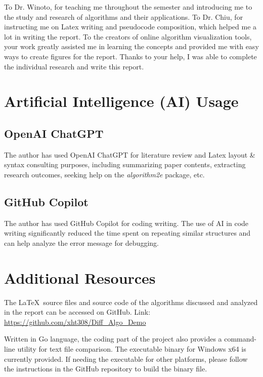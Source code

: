 \documentclass[sigplan,screen]{acmart}
\begin{document}

\begin{acks}
To Dr. Winoto, for teaching me throughout the semester and introducing me to the study and research of algorithms and their applications. To Dr. Chiu, for instructing me on Latex writing and pseudocode composition, which helped me a lot in writing the report. To the creators of online algorithm visualization tools, your work greatly assisted me in learning the concepts and provided me with easy ways to create figures for the report. Thanks to your help, I was able to complete the individual research and write this report.
\end{acks}




\appendix

\section{Artificial Intelligence (AI) Usage}

\subsection{OpenAI ChatGPT}

The author has used OpenAI ChatGPT for literature review and Latex layout \& syntax consulting purposes, including summarizing paper contents, extracting research outcomes, seeking help on the \textit{algorithm2e} package, etc.

\subsection{GitHub Copilot}

The author has used GitHub Copilot for coding writing. The use of AI in code writing significantly reduced the time spent on repeating similar structures and can help analyze the error message for debugging.

\section{Additional Resources}

The \LaTeX\ source files and source code of the algorithms discussed and analyzed in the report can be accessed on GitHub. Link: \url{https://github.com/xht308/Diff_Algo_Demo}

Written in Go language, the coding part of the project also provides a command-line utility for text file comparison. The executable binary for Windows x64 is currently provided. If needing the executable for other platforms, please follow the instructions in the GitHub repository to build the binary file.
\end{document}
